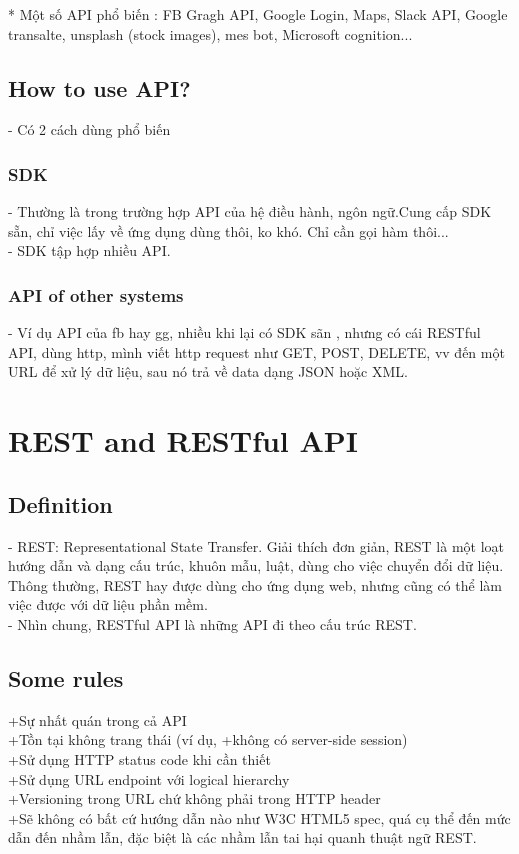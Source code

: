 \documentclass[class]{article}
\begin{document}
* Một số API phổ biến : FB Gragh API, Google Login, Maps, Slack API, Google transalte, unsplash (stock images), mes bot, Microsoft cognition...  \\
\subsection{How to use API?}
- Có 2 cách dùng phổ biến
\subsubsection{SDK}
- Thường là trong trường hợp API của hệ điều hành, ngôn ngữ.Cung cấp SDK sẵn, chỉ việc lấy về ứng dụng dùng thôi, ko khó. Chỉ cần gọi hàm thôi... \\
- SDK tập hợp nhiều API.
\subsubsection{API of other systems}
- Ví dụ API của fb hay gg, nhiều khi lại có SDK sãn , nhưng có cái RESTful API, dùng http, mình viết http request như GET, POST, DELETE, vv đến một URL để xử lý dữ liệu, sau nó trả về data dạng JSON hoặc XML.

\section{REST and RESTful API}
\subsection{Definition}
- REST: Representational State Transfer. Giải thích đơn giản, REST là một loạt hướng dẫn và dạng cấu trúc, khuôn mẫu, luật, dùng cho việc chuyển đổi dữ liệu. Thông thường, REST hay được dùng cho ứng dụng web, nhưng cũng có thể làm việc được với dữ liệu phần mềm.\\
- Nhìn chung, RESTful API là những API đi theo cấu trúc REST.
\subsection{Some rules}
+Sự nhất quán trong cả API \\
+Tồn tại không trang thái (ví dụ, +không có server-side session) \\
+Sử dụng HTTP status code khi cần thiết \\
+Sử dụng URL endpoint với logical hierarchy \\
+Versioning trong URL chứ không phải trong HTTP header \\
+Sẽ không có bất cứ hướng dẫn nào như W3C HTML5 spec, quá cụ thể đến mức dẫn đến nhầm lẫn, đặc biệt là các nhầm lẫn tai hại quanh thuật ngữ REST.
\end{document}
